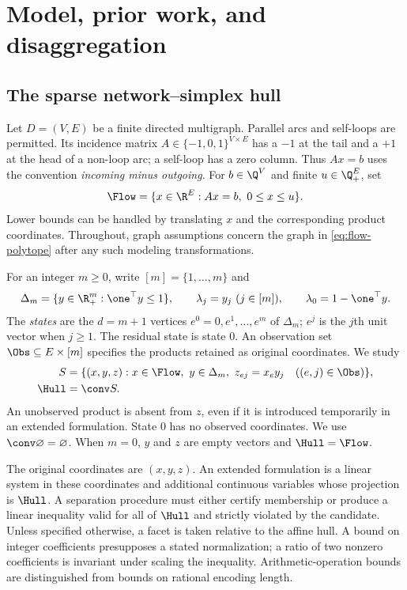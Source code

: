 \section{Model, prior work, and disaggregation}\label{sec:foundations}

\subsection{The sparse network--simplex hull}\label{subsec:model}
Let $D=(V,E)$ be a finite directed multigraph. Parallel arcs and self-loops
are permitted. Its incidence matrix $A\in\{-1,0,1\}^{V\times E}$ has a $-1$
at the tail and a $+1$ at the head of a non-loop arc; a self-loop has a zero
column. Thus $Ax=b$ uses the convention \emph{incoming minus outgoing}.
For $b\in\Q^V$ and finite $u\in\Q_+^E$, set
\begin{equation}\label{eq:flow-polytope}
 \Flow=\{x\in\R^E:Ax=b,\ 0\le x\le u\}.
\end{equation}
Lower bounds can be handled by translating $x$ and the corresponding product
coordinates. Throughout, graph assumptions concern the graph in
\eqref{eq:flow-polytope} after any such modeling transformations.

For an integer $m\ge0$, write $[m]=\{1,\ldots,m\}$ and
\begin{equation}\label{eq:simplex}
 \Delta_m=\{y\in\R_+^m:\one^\top y\le1\},\qquad
 \lambda_j=y_j\ (j\in[m]),\qquad
 \lambda_0=1-\one^\top y.
\end{equation}
The \emph{states} are the $d=m+1$ vertices $e^0=0,e^1,\ldots,e^m$ of
$\Delta_m$; $e^j$ is the $j$th unit vector when $j\ge1$. The residual state
is state $0$. An observation set $\Obs\subseteq E\times[m]$ specifies
the products retained as original coordinates. We study
\begin{align}
 S&=\{(x,y,z):x\in\Flow,\ y\in\Delta_m,
             \ z_{ej}=x_e y_j\quad((e,j)\in\Obs)\},\label{eq:graph-set}\\
 \Hull&=\conv S.\label{eq:sparse-hull}
\end{align}
An unobserved product is absent from $z$, even if it is introduced temporarily
in an extended formulation. State $0$ has no observed coordinates.
We use $\conv\varnothing=\varnothing$. When $m=0$, $y$ and $z$ are empty
vectors and $\Hull=\Flow$.

The original coordinates are $(x,y,z)$. An extended formulation is a linear
system in these coordinates and additional continuous variables whose
projection is $\Hull$. A separation procedure must either certify membership
or produce a linear inequality valid for all of $\Hull$ and strictly violated
by the candidate. Unless specified otherwise, a facet is taken relative to
the affine hull. A bound on integer coefficients presupposes a stated
normalization; a ratio of two nonzero coefficients is invariant under scaling
the inequality. Arithmetic-operation bounds are distinguished from bounds
on rational encoding length.

